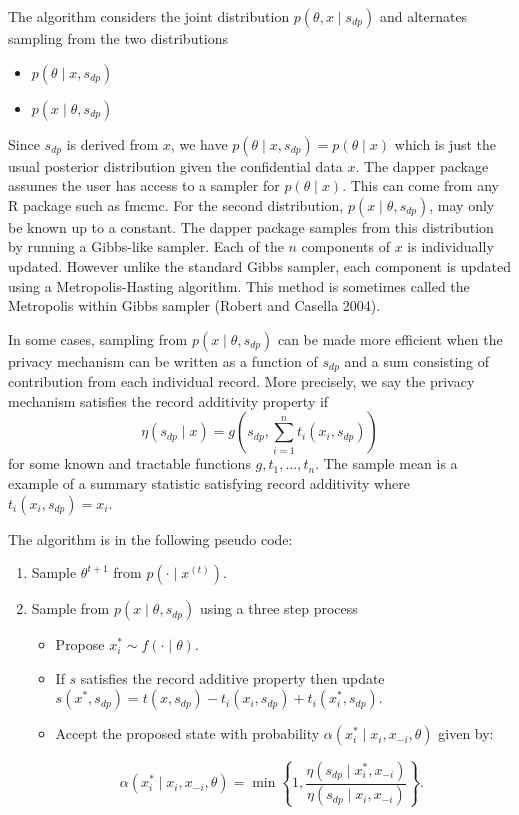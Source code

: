 The algorithm considers the joint distribution \(p(\theta, x \mid s_{dp})\) and
alternates sampling from the two distributions

\begin{itemize}
\tightlist
\item
  \(p(\theta \mid x, s_{dp})\)
\item
  \(p(x \mid \theta, s_{dp})\)
\end{itemize}

Since \(s_{dp}\) is derived from \(x\), we have \(p(\theta \mid x, s_{dp}) = p(\theta \mid x)\) which
is just the usual posterior distribution given the confidential data \(x\). The dapper
package assumes the user has access to a sampler for \(p(\theta \mid x)\). This can
come from any R package such as fmcmc. For the second distribution, \(p(x \mid \theta, s_{dp})\), may
only be known up to a constant. The dapper package samples from this distribution by
running a Gibbs-like sampler. Each of the \(n\) components of \(x\) is individually
updated. However unlike the standard Gibbs sampler, each component is updated
using a Metropolis-Hasting algorithm. This method is sometimes called the Metropolis within Gibbs sampler (Robert and Casella 2004).

In some cases, sampling from \(p(x \mid \theta, s_{dp})\) can be made more efficient
when the privacy mechanism can be written as a function of \(s_{dp}\) and
a sum consisting of contribution from each individual record. More precisely, we say the privacy mechanism satisfies
the record additivity property if
\[
\eta(s_{dp} \mid x) = g(s_{dp}, \sum_{i=1}^{n}t_i(x_i, s_{dp}))
\]
for some known and tractable functions \(g, t_1, \ldots, t_n\). The sample mean is a
example of a summary statistic satisfying record additivity where \(t_i(x_i, s_{dp}) = x_i\).

The algorithm is in the following pseudo code:

\begin{enumerate}
\def\labelenumi{\arabic{enumi}.}
\tightlist
\item
  Sample \(\theta^{t+1}\) from \(p(\cdot \mid x^{(t)})\).
\item
  Sample from \(p(x \mid \theta, s_{dp})\) using a three step process

  \begin{itemize}
  \tightlist
  \item
    Propose \(x_{i}^{*} \sim f(\cdot \mid \theta)\).
  \item
    If \(s\) satisfies the record additive property then
    update \(s(x^*, s_{dp}) = t(x,s_{dp}) - t_i(x_i,s_{dp}) + t_{i}(x_i^*, s_{dp})\).
  \item
    Accept the proposed state with probability \(\alpha(x_i^* \mid x_i, x_{-i}, \theta)\)
    given by:
  \end{itemize}

  \[
     \alpha(x_i^* \mid x_i, x_{-i}, \theta) = \min \left\{ 1, \dfrac{\eta(s_{dp} \mid x_i^*, x_{-i})}{\eta(s_{dp} \mid x_i, x_{-i})} \right\}.
   \]
\end{enumerate}

